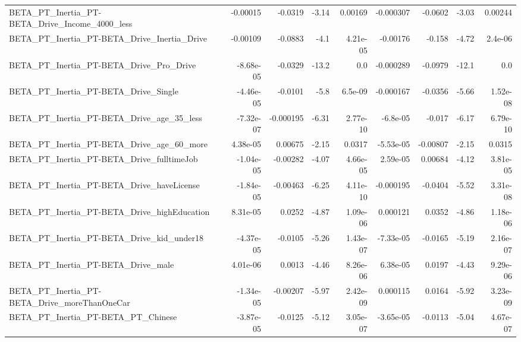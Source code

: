 \begin{tabular}{lrrrrrrrr}
BETA\_PT\_Inertia\_PT-BETA\_Drive\_Income\_4000\_less     &    -0.00015 &      -0.0319 &    -3.14 &  0.00169 &  -0.000307 &     -0.0602 &        -3.03 &       0.00244 \\
BETA\_PT\_Inertia\_PT-BETA\_Drive\_Inertia\_Drive        &    -0.00109 &      -0.0883 &     -4.1 & 4.21e-05 &   -0.00176 &      -0.158 &        -4.72 &       2.4e-06 \\
BETA\_PT\_Inertia\_PT-BETA\_Drive\_Pro\_Drive            &   -8.68e-05 &      -0.0329 &    -13.2 &      0.0 &  -0.000289 &     -0.0979 &        -12.1 &           0.0 \\
BETA\_PT\_Inertia\_PT-BETA\_Drive\_Single               &   -4.46e-05 &      -0.0101 &     -5.8 &  6.5e-09 &  -0.000167 &     -0.0356 &        -5.66 &      1.52e-08 \\
BETA\_PT\_Inertia\_PT-BETA\_Drive\_age\_35\_less          &   -7.32e-07 &    -0.000195 &    -6.31 & 2.77e-10 &   -6.8e-05 &      -0.017 &        -6.17 &      6.79e-10 \\
BETA\_PT\_Inertia\_PT-BETA\_Drive\_age\_60\_more          &    4.38e-05 &      0.00675 &    -2.15 &   0.0317 &  -5.53e-05 &    -0.00807 &        -2.15 &        0.0315 \\
BETA\_PT\_Inertia\_PT-BETA\_Drive\_fulltimeJob          &   -1.04e-05 &     -0.00282 &    -4.07 & 4.66e-05 &   2.59e-05 &     0.00684 &        -4.12 &      3.81e-05 \\
BETA\_PT\_Inertia\_PT-BETA\_Drive\_haveLicense          &   -1.84e-05 &     -0.00463 &    -6.25 & 4.11e-10 &  -0.000195 &     -0.0404 &        -5.52 &      3.31e-08 \\
BETA\_PT\_Inertia\_PT-BETA\_Drive\_highEducation        &    8.31e-05 &       0.0252 &    -4.87 & 1.09e-06 &   0.000121 &      0.0352 &        -4.86 &      1.18e-06 \\
BETA\_PT\_Inertia\_PT-BETA\_Drive\_kid\_under18          &   -4.37e-05 &      -0.0105 &    -5.26 & 1.43e-07 &  -7.33e-05 &     -0.0165 &        -5.19 &      2.16e-07 \\
BETA\_PT\_Inertia\_PT-BETA\_Drive\_male                 &    4.01e-06 &       0.0013 &    -4.46 & 8.26e-06 &   6.38e-05 &      0.0197 &        -4.43 &      9.29e-06 \\
BETA\_PT\_Inertia\_PT-BETA\_Drive\_moreThanOneCar       &   -1.34e-05 &     -0.00207 &    -5.97 & 2.42e-09 &   0.000115 &      0.0164 &        -5.92 &      3.23e-09 \\
BETA\_PT\_Inertia\_PT-BETA\_PT\_Chinese                 &   -3.87e-05 &      -0.0125 &    -5.12 & 3.05e-07 &  -3.65e-05 &     -0.0113 &        -5.04 &      4.67e-07 \\

\end{tabular}

